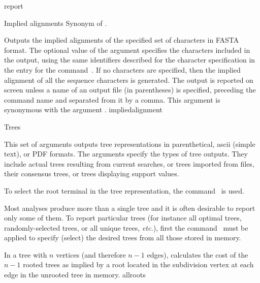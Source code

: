 \begin{command}{report}{}
\begin{arguments}
\begin{argumentgroup}{Implied alignments}
                {Synonym of .}
                {}
                
                {Outputs the implied alignments of the specified
                set of characters in FASTA format. The optional value of the
                argument specifies the characters included
                in the output, using the same identifiers described for the
                character specification in the entry for the command~. If no
                characters are specified, then the implied alignment of all the
                sequence characters is generated. The output is reported on
                screen unless a name of an output file (in parentheses) is
                specified, preceding the command name and separated from it by a
                comma. This argument is synonymous with the argument
                .}
                {impliedalignment}

        \end{argumentgroup}
        
	\begin{argumentgroup}{Trees}
            {This set of arguments outputs tree representations
            in parenthetical, ascii (simple text), or PDF formats.
            The arguments specify the types of tree outputs. They include
            actual trees resulting from current searches, or trees imported from
            files, their consensus trees, or trees displaying support values.
            
            To select the root terminal in the tree representation, the command~ is used.
            
            Most analyses produce more than a single tree and it is
            often desirable to report only some of them. To
            report particular trees (for instance all optimal trees,
            randomly-selected trees, or all unique trees, \emph{etc.}), first the
            command~ must be applied to specify (select)
             the desired trees from all those stored in memory.} 

                {In a tree with $n$ vertices (and therefore $n - 1$ edges),
                calculates the cost of the $n - 1$ rooted trees as implied by a
                root located in the subdivision vertex at each edge in the unrooted
                tree in memory.}
                {allroots}


\end{argumentgroup}
\end{arguments}
\end{command}
